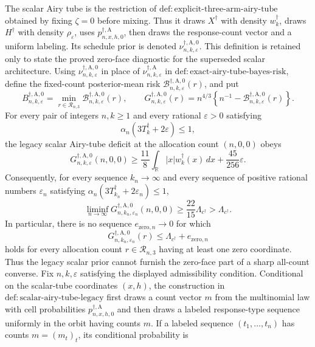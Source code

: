 The scalar Airy tube is the restriction of \(\mathrm{def:explicit\text{-}three\text{-}arm\text{-}airy\text{-}tube}\) obtained by fixing \(\zeta=0\) before mixing.  Thus it draws \(X^\dagger\) with density \(w_k^\dagger\), draws \(H^\dagger\) with density \(\rho_\varepsilon\), uses \(p_{n,x,h,0}^{\dagger,\mathrm A}\), then draws the response-count vector and a uniform labeling.  Its schedule prior is denoted \(\nu_{n,k,\varepsilon}^{\dagger,\mathrm A,0}\).  This definition is retained only to state the proved zero-face diagnostic for the superseded scalar architecture.
Using \(\nu_{n,k,\varepsilon}^{\dagger,\mathrm A,0}\) in place of \(\nu_{n,k,\varepsilon}^{\dagger,\mathrm A}\) in \(\mathrm{def:exact\text{-}airy\text{-}tube\text{-}bayes\text{-}risk}\), define the fixed-count posterior-mean risk \(\mathcal B_{n,k,\varepsilon}^{\dagger,\mathrm A,0}(r)\), and put
\[
B_{n,k,\varepsilon}^{\dagger,\mathrm A,0}
=\min_{r\in\mathcal R_{n,3}}
\mathcal B_{n,k,\varepsilon}^{\dagger,\mathrm A,0}(r),
\qquad
G_{n,k,\varepsilon}^{\dagger,\mathrm A,0}(r)
=n^{4/3}\left\{n^{-1}-
\mathcal B_{n,k,\varepsilon}^{\dagger,\mathrm A,0}(r)\right\}.
\]
For every pair of integers \(n,k\geq1\) and every rational \(\varepsilon>0\) satisfying
\[
\alpha_n(3T_k^\dagger+2\varepsilon)\leq1,
\]
the legacy scalar Airy-tube deficit at the allocation count \((n,0,0)\) obeys
\[
G_{n,k,\varepsilon}^{\dagger,\mathrm A,0}(n,0,0)
\geq
\frac{11}{8}\int_{\mathbb R}|x|w_k^\dagger(x)\,dx
+\frac{45}{256}\varepsilon.
\]
Consequently, for every sequence \(k_n\to\infty\) and every sequence of positive rational numbers \(\varepsilon_n\) satisfying
\(\alpha_n(3T_{k_n}^\dagger+2\varepsilon_n)\leq1\),
\[
\liminf_{n\to\infty}
G_{n,k_n,\varepsilon_n}^{\dagger,\mathrm A,0}(n,0,0)
\geq\frac{22}{15}\Lambda_{c^\dagger}
>\Lambda_{c^\dagger}.
\]
In particular, there is no sequence \(e_{\mathrm{zero},n}\to0\) for which
\[
G_{n,k_n,\varepsilon_n}^{\dagger,\mathrm A,0}(r)
\leq\Lambda_{c^\dagger}+e_{\mathrm{zero},n}
\]
holds for every allocation count \(r\in\mathcal R_{n,3}\) having at least one zero coordinate.  Thus the legacy scalar prior cannot furnish the zero-face part of a sharp all-count converse.
Fix \(n,k,\varepsilon\) satisfying the displayed admissibility condition.  Conditional on the scalar-tube coordinates \((x,h)\), the construction in \(\mathrm{def:scalar\text{-}airy\text{-}tube\text{-}legacy}\) first draws a count vector \(m\) from the multinomial law with cell probabilities \(p_{n,x,h,0}^{\dagger,\mathrm A}\) and then draws a labeled response-type sequence uniformly in the orbit having counts \(m\).  If a labeled sequence \((t_1,\ldots,t_n)\) has counts \(m=(m_t)_t\), its conditional probability is
